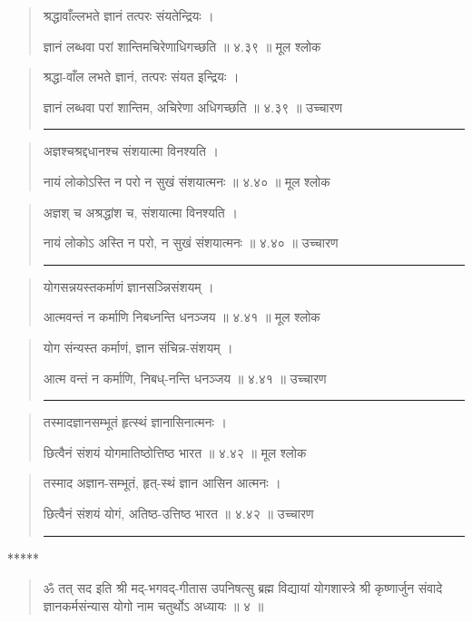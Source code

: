 \begin{quotation}

श्रद्धावाँल्लभते ज्ञानं तत्परः संयतेन्द्रियः  ।  

ज्ञानं लब्धवा परां शान्तिमचिरेणाधिगच्छति  ॥ ४.३९ ॥  मूल श्लोक
\end{quotation}

\begin{quotation}

श्रद्धा-वाँल लभते ज्ञानं, तत्परः संयत इन्द्रियः  ।  

ज्ञानं लब्धवा परां शान्तिम, अचिरेणा अधिगच्छति  ॥ ४.३९ ॥  उच्चारण

\noindent\rule{16cm}{0.4pt} 
\end{quotation}


\begin{quotation}

अज्ञश्चश्रद्दधानश्च संशयात्मा विनश्यति  ।  

नायं लोकोऽस्ति न परो न सुखं संशयात्मनः  ॥ ४.४० ॥  मूल श्लोक
\end{quotation}

\begin{quotation}
अज्ञश् च अश्रद्धांश च, संशयात्मा विनश्यति  ।  

नायं लोकोऽ अस्ति न परो, न सुखं संशयात्मनः  ॥ ४.४० ॥  उच्चारण

\noindent\rule{16cm}{0.4pt} 
\end{quotation}


\begin{quotation}

योगसन्नयस्तकर्माणं ज्ञानसञ्न्निसंशयम्‌  ।  

आत्मवन्तं न कर्माणि निबध्नन्ति धनञ्जय  ॥ ४.४१ ॥  मूल श्लोक
\end{quotation}

\begin{quotation}

योग संन्यस्त कर्माणं, ज्ञान संचिन्न-संशयम्‌  ।  

आत्म वन्तं न कर्माणि, निबध्-नन्ति धनञ्जय  ॥ ४.४१ ॥  उच्चारण

\noindent\rule{16cm}{0.4pt} 
\end{quotation}


\begin{quotation}

तस्मादज्ञानसम्भूतं हृत्स्थं ज्ञानासिनात्मनः  ।  

छित्वैनं संशयं योगमातिष्ठोत्तिष्ठ भारत  ॥ ४.४२ ॥  मूल श्लोक
\end{quotation}

\begin{quotation}

तस्माद अज्ञान-सम्भूतं, हृत्-स्थं  ज्ञान आसिन आत्मनः  ।  

छित्वैनं संशयं योगं, अतिष्ठ-उत्तिष्ठ भारत  ॥ ४.४२ ॥   उच्चारण

\noindent\rule{16cm}{0.4pt} 
\end{quotation}

\begin{center} ***** \end{center}

\begin{quotation}

ॐ तत् सद इति श्री मद्-भगवद्-गीतास उपनिषत्सु ब्रह्म विद्यायां योगशास्त्रे श्री कृष्णार्जुन संवादे ज्ञानकर्मसंन्यास योगो नाम चतुर्थोऽ अध्यायः  ॥  ४  ॥ 

\end{quotation}

